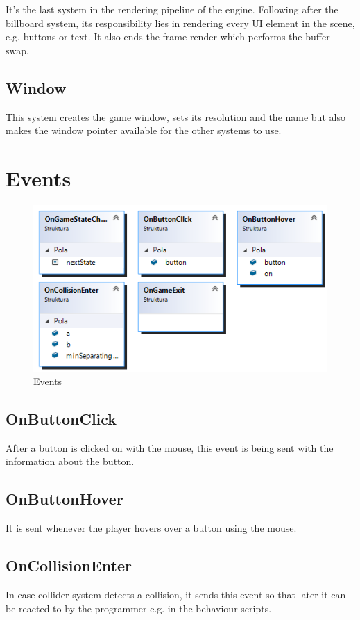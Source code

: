 \documentclass[12pt, english]{article}
\begin{document}
It's the last system in the rendering pipeline of the engine. Following after
the billboard system, its responsibility lies in rendering every UI element in
the scene, e.g. buttons or text. It also ends the frame render which performs
the buffer swap.

\subsection{Window}

This system creates the game window, sets its resolution and the name but also
makes the window pointer available for the other systems to use.

\section{Events}

\begin{figure}
	\centering
	\includegraphics[width=\textwidth]{image2.png}
	\caption{Events}
	\label{figure_events}
\end{figure}

\subsection{OnButtonClick}
After a button is clicked on with the mouse, this event is being sent with the
information about the button.

\subsection{OnButtonHover}
It is sent whenever the player hovers over a button using the mouse.

\subsection{OnCollisionEnter}
In case collider system detects a collision, it sends this event so that later
it can be reacted to by the programmer e.g. in the behaviour scripts.
\end{document}
